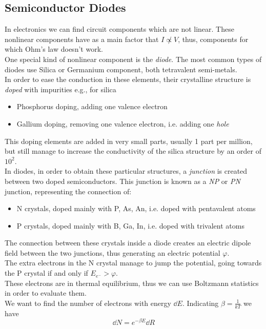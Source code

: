 \documentclass[../electromagnetism.tex]{subfiles}
\begin{document}
\subsection{Semiconductor Diodes}
In electronics we can find circuit components which are not linear. These nonlinear components have as a main factor that $I\not\propto V$, thus, components for which Ohm's law doesn't work.\\
One special kind of nonlinear component is the \textit{diode}. The most common types of diodes use Silica or Germanium component, both tetravalent semi-metals.\\
In order to ease the conduction in these elements, their crystalline structure is \textit{doped} with impurities e.g., for silica
\begin{itemize}
\item Phosphorus doping, adding one valence electron
\item Gallium doping, removing one valence electron, i.e. adding one \textit{hole} 
\end{itemize}
This doping elements are added in very small parts, usually 1 part per million, but still manage to increase the conductivity of the silica structure by an order of $10^2$.\\
In diodes, in order to obtain these particular structures, a \textit{junction} is created between two doped semiconductors. This junction is known as a \textit{NP} or \textit{PN} junction, representing the connection of:
\begin{itemize}
\item N crystals, doped mainly with P, As, An, i.e. doped with pentavalent atoms
\item P crystals, doped mainly with B, Ga, In, i.e. doped with trivalent atoms
\end{itemize}
The connection between these crystals inside a diode creates an electric dipole field between the two junctions, thus generating an electric potential $\varphi$.\\
The extra electrons in the N crystal manage to jump the potential, going towards the P crystal if and only if $E_{e^-}>\varphi$.\\
These electrons are in thermal equilibrium, thus we can use Boltzmann statistics in order to evaluate them.\\
We want to find the number of electrons with energy $\dd E$. Indicating $\beta=\frac{1}{kT}$ we have
\begin{equation*}
	\dd N=e^{-\beta E}\dd R
\end{equation*}
\end{document}
